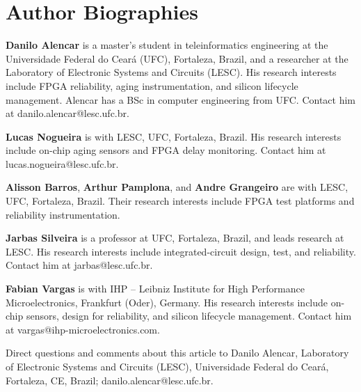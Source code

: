 \documentclass[10pt,twocolumn]{article}
\begin{document}
\section*{Author Biographies}
\footnotesize
\noindent\textbf{Danilo Alencar} is a master's student in teleinformatics engineering at the Universidade Federal do Cear\'a (UFC), Fortaleza, Brazil, and a researcher at the Laboratory of Electronic Systems and Circuits (LESC). His research interests include FPGA reliability, aging instrumentation, and silicon lifecycle management. Alencar has a BSc in computer engineering from UFC. Contact him at danilo.alencar@lesc.ufc.br.

\smallskip\noindent\textbf{Lucas Nogueira} is with LESC, UFC, Fortaleza, Brazil. His research interests include on-chip aging sensors and FPGA delay monitoring. Contact him at lucas.nogueira@lesc.ufc.br.

\smallskip\noindent\textbf{Alisson Barros}, \textbf{Arthur Pamplona}, and \textbf{Andre Grangeiro} are with LESC, UFC, Fortaleza, Brazil. Their research interests include FPGA test platforms and reliability instrumentation.

\smallskip\noindent\textbf{Jarbas Silveira} is a professor at UFC, Fortaleza, Brazil, and leads research at LESC. His research interests include integrated-circuit design, test, and reliability. Contact him at jarbas@lesc.ufc.br.

\smallskip\noindent\textbf{Fabian Vargas} is with IHP -- Leibniz Institute for High Performance Microelectronics, Frankfurt (Oder), Germany. His research interests include on-chip sensors, design for reliability, and silicon lifecycle management. Contact him at vargas@ihp-microelectronics.com.

\medskip\noindent Direct questions and comments about this article to Danilo Alencar, Laboratory of Electronic Systems and Circuits (LESC), Universidade Federal do Cear\'a, Fortaleza, CE, Brazil; danilo.alencar@lesc.ufc.br.
\end{document}

